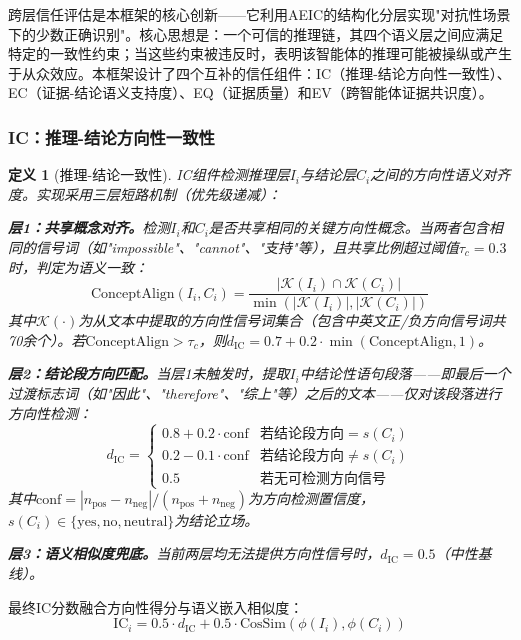\documentclass[12pt,a4paper,UTF8,fontset=fandol]{ctexart}
\newtheorem{definition}{定义}[section]
\begin{document}
跨层信任评估是本框架的核心创新——它利用AEIC的结构化分层实现"对抗性场景下的少数正确识别"。核心思想是：一个可信的推理链，其四个语义层之间应满足特定的一致性约束；当这些约束被违反时，表明该智能体的推理可能被操纵或产生于从众效应。本框架设计了四个互补的信任组件：IC（推理-结论方向性一致性）、EC（证据-结论语义支持度）、EQ（证据质量）和EV（跨智能体证据共识度）。

\subsubsection{IC：推理-结论方向性一致性}

\begin{definition}[推理-结论一致性]\label{def:ic}
IC组件检测推理层$I_i$与结论层$C_i$之间的方向性语义对齐度。实现采用三层短路机制（优先级递减）：

\textbf{层1：共享概念对齐。}检测$I_i$和$C_i$是否共享相同的关键方向性概念。当两者包含相同的信号词（如"impossible"、"cannot"、"支持"等），且共享比例超过阈值$\tau_c = 0.3$时，判定为语义一致：
\begin{equation}
\text{ConceptAlign}(I_i, C_i) = \frac{|\mathcal{K}(I_i) \cap \mathcal{K}(C_i)|}{\min(|\mathcal{K}(I_i)|, |\mathcal{K}(C_i)|)}
\end{equation}
其中$\mathcal{K}(\cdot)$为从文本中提取的方向性信号词集合（包含中英文正/负方向信号词共70余个）。若$\text{ConceptAlign} > \tau_c$，则$d_{\text{IC}} = 0.7 + 0.2 \cdot \min(\text{ConceptAlign}, 1)$。

\textbf{层2：结论段方向匹配。}当层1未触发时，提取$I_i$中结论性语句段落——即最后一个过渡标志词（如"因此"、"therefore"、"综上"等）之后的文本——仅对该段落进行方向性检测：
\begin{equation}
d_{\text{IC}} = \begin{cases}
0.8 + 0.2 \cdot \text{conf} & \text{若结论段方向} = s(C_i) \\
0.2 - 0.1 \cdot \text{conf} & \text{若结论段方向} \neq s(C_i) \\
0.5 & \text{若无可检测方向信号}
\end{cases}
\end{equation}
其中$\text{conf} = |n_{\text{pos}} - n_{\text{neg}}| / (n_{\text{pos}} + n_{\text{neg}})$为方向检测置信度，$s(C_i) \in \{\text{yes}, \text{no}, \text{neutral}\}$为结论立场。

\textbf{层3：语义相似度兜底。}当前两层均无法提供方向性信号时，$d_{\text{IC}} = 0.5$（中性基线）。
\end{definition}

最终IC分数融合方向性得分与语义嵌入相似度：
\begin{equation}\label{eq:ic}
\text{IC}_i = 0.5 \cdot d_{\text{IC}} + 0.5 \cdot \text{CosSim}(\phi(I_i), \phi(C_i))
\end{equation}
\end{document}
